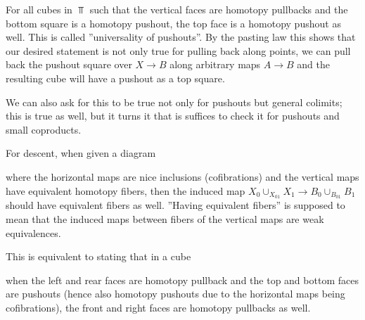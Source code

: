For all cubes in $\Top$ such that the vertical faces are homotopy pullbacks and the bottom square is a homotopy pushout, the top face is a homotopy pushout as well.
This is called  ''universality of pushouts''.
By the pasting law this shows that our desired statement is not only true for pulling back along points, we can pull back the pushout square over $X\to B$ along arbitrary maps $A\to B$ and the resulting cube will have a pushout as a top square.

We can also ask for this to be true not only for pushouts but general colimits; this is true as well, but it turns it that is suffices to check it for pushouts and small coproducts.

For descent, when given a diagram 
\begin{center}
\end{center}
where the horizontal maps are nice inclusions (cofibrations) and the vertical maps have equivalent homotopy fibers, then the induced map $X_0\cup_{X_{01}}X_1\to B_0\cup_{B_{01}}B_1$ should have equivalent fibers as well.
''Having equivalent fibers'' is supposed to mean that the induced maps between fibers of the vertical maps are weak equivalences.

This is equivalent to stating that in a cube 
\begin{center}
\end{center}
when the left and rear faces are homotopy pullback and the top and bottom faces are pushouts (hence also homotopy pushouts due to the horizontal maps being cofibrations), the front and right faces are homotopy pullbacks as well.


